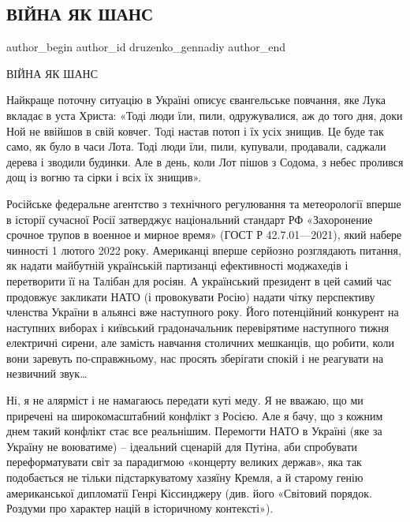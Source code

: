  
 
 
 
 
 
\subsection{ВІЙНА ЯК ШАНС}
\label{sec:21_12_2021.fb.druzenko_gennadiy.1.vojna_kak_shans}
 
\ifcmt
 author_begin
   author_id druzenko_gennadiy
 author_end
\fi

ВІЙНА ЯК ШАНС

Найкраще поточну ситуацію в Україні описує євангельське повчання, яке Лука
вкладає в уста Христа: «Тоді люди їли, пили, одружувалися, аж до того дня, доки
Ной не ввійшов в свій ковчег. Тоді настав потоп і їх усіх знищив. Це буде так
само, як було в часи Лота. Тоді люди їли, пили, купували, продавали, саджали
дерева і зводили будинки. Але в день, коли Лот пішов з Содома, з небес пролився
дощ із вогню та сірки і всіх їх знищив».


Російське федеральне агентство з технічного регулювання та метеорології вперше
в історії сучасної Росії затверджує національний стандарт РФ «Захоронение
срочное трупов в военное и мирное время» (ГОСТ Р 42.7.01—2021), який набере
чинності 1 лютого 2022 року. Американці вперше серйозно розглядають питання, як
надати майбутній українській партизанці ефективності моджахедів і перетворити
її на Талібан для росіян. А український президент в цей самий час продовжує
закликати НАТО (і провокувати Росію) надати чітку перспективу членства України
в альянсі вже наступного року. Його потенційний конкурент на наступних виборах
і київський градоначальник перевірятиме наступного тижня електричні сирени, але
замість навчання столичних мешканців, що робити, коли вони заревуть
по-справжньому, нас просять зберігати спокій і не реагувати на незвичний звук…

Ні, я не алярміст і не намагаюсь передати куті меду. Я не вважаю, що ми
приречені на широкомасштабний конфлікт з Росією. Але я бачу, що з кожним днем
такий конфлікт стає все реальнішим. Перемогти НАТО в Україні (яке за Україну не
воюватиме) – ідеальний сценарій для Путіна, аби спробувати переформатувати світ
за парадигмою «концерту великих держав», яка так подобається не тільки
підстаркуватому хазяїну Кремля, а й старому генію американської дипломатії
Генрі Кіссинджеру (див. його «Світовий порядок. Роздуми про характер націй в
історичному контексті»).

